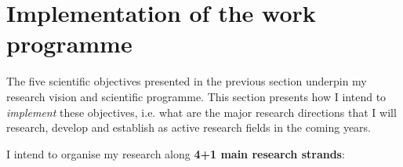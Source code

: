 







\vspace{3em}
\section{Implementation of the work programme}


The five scientific objectives presented in the previous section underpin my
research vision and scientific programme. This section presents how I intend
to \emph{implement} these objectives, i.e.  what are the major research
directions that I will research, develop and establish as active research fields
in the coming years.

\vspace{0.5em}
I intend to organise my research along \textbf{4+1 main research
strands}:

